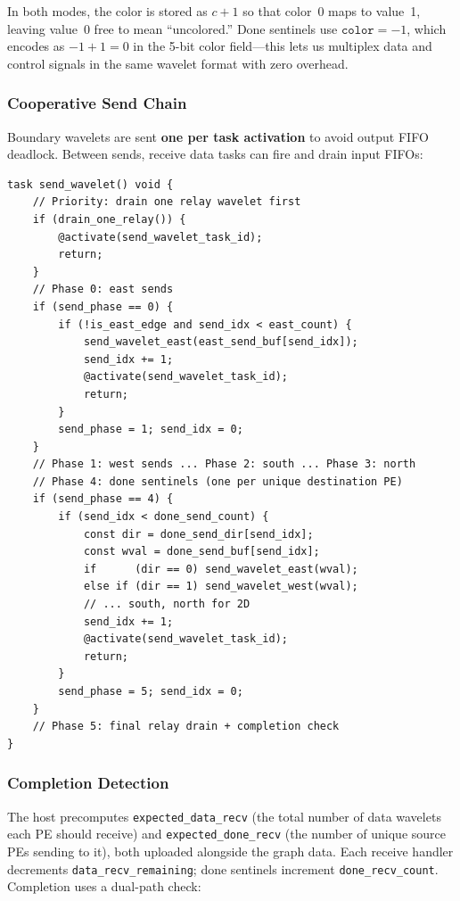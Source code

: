 \documentclass[11pt,letterpaper]{article}
\begin{document}
In both modes, the color is stored as $c + 1$ so that color~0 maps to value~1, leaving value~0 free to mean ``uncolored.'' Done sentinels use $\texttt{color} = -1$, which encodes as $-1+1 = 0$ in the 5-bit color field---this lets us multiplex data and control signals in the same wavelet format with zero overhead.

\subsubsection{Cooperative Send Chain}

Boundary wavelets are sent \textbf{one per task activation} to avoid output FIFO deadlock. Between sends, receive data tasks can fire and drain input FIFOs:

\begin{lstlisting}[language=CSL, caption={One-at-a-time send (from \texttt{pe\_program.csl})}, label=lst:sendchain]
task send_wavelet() void {
    // Priority: drain one relay wavelet first
    if (drain_one_relay()) {
        @activate(send_wavelet_task_id);
        return;
    }
    // Phase 0: east sends
    if (send_phase == 0) {
        if (!is_east_edge and send_idx < east_count) {
            send_wavelet_east(east_send_buf[send_idx]);
            send_idx += 1;
            @activate(send_wavelet_task_id);
            return;
        }
        send_phase = 1; send_idx = 0;
    }
    // Phase 1: west sends ... Phase 2: south ... Phase 3: north
    // Phase 4: done sentinels (one per unique destination PE)
    if (send_phase == 4) {
        if (send_idx < done_send_count) {
            const dir = done_send_dir[send_idx];
            const wval = done_send_buf[send_idx];
            if      (dir == 0) send_wavelet_east(wval);
            else if (dir == 1) send_wavelet_west(wval);
            // ... south, north for 2D
            send_idx += 1;
            @activate(send_wavelet_task_id);
            return;
        }
        send_phase = 5; send_idx = 0;
    }
    // Phase 5: final relay drain + completion check
}
\end{lstlisting}

\subsubsection{Completion Detection}

The host precomputes \texttt{expected\_data\_recv} (the total number of data wavelets each PE should receive) and \texttt{expected\_done\_recv} (the number of unique source PEs sending to it), both uploaded alongside the graph data. Each receive handler decrements \texttt{data\_recv\_remaining}; done sentinels increment \texttt{done\_recv\_count}. Completion uses a dual-path check:
\end{document}
